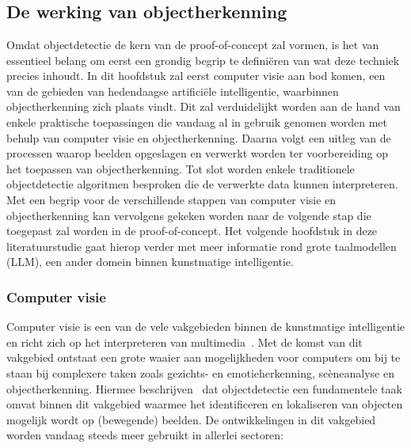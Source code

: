 \chapter{}
\label{ch:stand-van-zaken}




\section{De werking van objectherkenning}\label{sec:ls-object-detectie}
Omdat objectdetectie de kern van de proof-of-concept zal vormen, is het van essentieel belang om eerst een grondig begrip te defini\"eren van wat deze techniek precies inhoudt.
In dit hoofdstuk zal eerst computer visie aan bod komen, een van de gebieden van hedendaagse artifici\"ele intelligentie, waarbinnen objectherkenning zich plaats vindt.
Dit zal verduidelijkt worden aan de hand van enkele praktische toepassingen die vandaag al in gebruik genomen worden met behulp van computer visie en objectherkenning.
Daarna volgt een uitleg van de processen waarop beelden opgeslagen en verwerkt worden ter voorbereiding op het toepassen van objectherkenning.
Tot slot worden enkele traditionele objectdetectie algoritmen besproken die de verwerkte data kunnen interpreteren.
Met een begrip voor de verschillende stappen van computer visie en objectherkenning kan vervolgens gekeken worden naar de volgende stap die toegepast zal worden in de proof-of-concept.
Het volgende hoofdstuk in deze literatuurstudie gaat hierop verder met meer informatie rond grote taalmodellen (LLM), een ander domein binnen kunstmatige intelligentie.

\subsection{Computer visie}\label{subsec:de-kern-van-objectdetectie}
Computer visie is een van de vele vakgebieden binnen de kunstmatige intelligentie en richt zich op het interpreteren van multimedia~\autocite{Moin2023}.
Met de komst van dit vakgebied ontstaat een grote waaier aan mogelijkheden voor computers om bij te staan bij complexere taken zoals gezichts- en emotieherkenning, sc\`eneanalyse en objectherkenning.
Hiermee beschrijven~\textcite{Tasnim2023} dat objectdetectie een fundamentele taak omvat binnen dit vakgebied waarmee het identificeren en lokaliseren van objecten mogelijk wordt op (bewegende) beelden.
De ontwikkelingen in dit vakgebied worden vandaag steeds meer gebruikt in allerlei sectoren:

